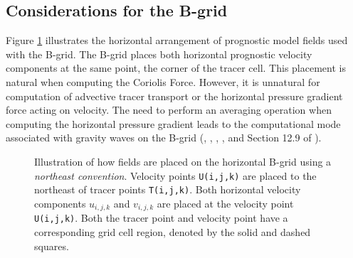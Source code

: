 \subsection{Considerations for the B-grid}
\label{subsection:b-grid-richardson-number}

Figure \ref{fig:b-grid} illustrates the horizontal arrangement of
prognostic model fields used with the B-grid. The B-grid places both
horizontal prognostic velocity components at the same point, the
corner of the tracer cell.  This placement is natural when computing
the Coriolis Force.  However, it is unnatural for computation of
advective tracer transport or the horizontal pressure gradient force
acting on velocity.  The need to perform an averaging operation when
computing the horizontal pressure gradient leads to the computational
mode associated with gravity waves on the B-grid (\cite{Mesinger1973},
\cite{KillworthFreesurf1991}, \cite{MOM3manual},
\cite{GriffiesPacSchmidtBalaji2001}, and Section 12.9 of
\cite{SMGbook}).

\begin{figure}
\begin{center}
\caption[Placement of fields onto the B-grid] {Illustration of how
  fields are placed on the horizontal B-grid using a {\it northeast
    convention}.  Velocity points {\tt U(i,j,k)} are placed to the
  northeast of tracer points {\tt T(i,j,k)}.  Both horizontal velocity
  components $u_{i,j,k}$ and $v_{i,j,k}$ are placed at the velocity
  point {\tt U(i,j,k)}.  Both the tracer point and velocity point have
  a corresponding grid cell region, denoted by the solid and dashed
  squares.}
\label{fig:b-grid}
\end{center}
\end{figure}

